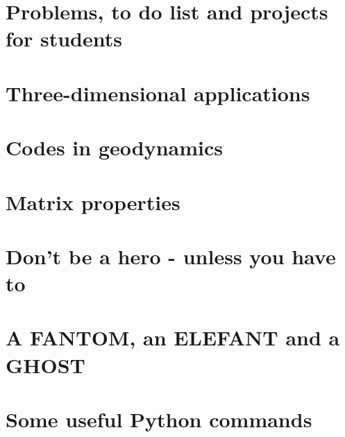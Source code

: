 \documentclass[a4paper]{article}
\begin{document}
\newpage %
\section{Problems, to do list and projects for students} %

\appendix %

\newpage %
\section{Three-dimensional applications}  %
\newpage %
\section{Codes in geodynamics \label{app:codes} } %
\newpage %
\section{Matrix properties}  %
\newpage %
\section{Don’t be a hero - unless you have to}  %
\newpage %
\section{A FANTOM, an ELEFANT and a GHOST}  %
\newpage %
\section{Some useful Python commands}  %
\newpage %
\end{document}

